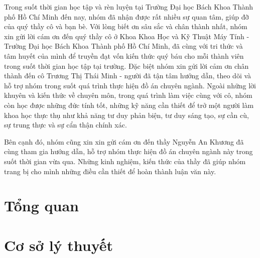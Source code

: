 \documentclass[a4paper, oneside, 12pt]{report}
\theoremstyle{definition}
\begin{document}
	Trong suốt thời gian học tập và rèn luyện tại Trường Đại học Bách Khoa Thành phố Hồ Chí Minh đến nay, nhóm đã nhận được rất nhiều sự quan tâm, giúp đỡ của quý thầy cô và bạn bè. Với lòng biết ơn sâu sắc và chân thành nhất, nhóm xin gửi lời cám ơn đến quý thầy cô ở Khoa Khoa Học và Kỹ Thuật Máy Tính - Trường Đại học Bách Khoa Thành phố Hồ Chí Minh, đã cùng với tri thức và tâm huyết của mình để truyền đạt vốn kiến thức quý báu cho mỗi thành viên trong suốt thời gian học tập tại trường. Đặc biệt nhóm xin gửi lời cảm ơn chân thành đến cô Trương Thị Thái Minh - người đã tận tâm hướng dẫn, theo dõi và hỗ trợ nhóm trong suốt quá trình thực hiện đồ án chuyên ngành. Ngoài những lời khuyên và kiến thức về chuyên môn, trong quá trình làm việc cùng với cô, nhóm còn học được những đức tính tốt, những kỹ năng cần thiết để trở một người làm khoa học thực thụ như khả năng tư duy phản biện, tư duy sáng tạo, sự cần cù, sự trung thực và sự cẩn thận chính xác.
	
	Bên cạnh đó, nhóm cũng xin xin gửi cám ơn đến thầy Nguyễn An Khương đã cùng tham gia hướng dẫn, hỗ trợ nhóm thực hiện đồ án chuyên ngành này trong suốt thời gian vừa qua. Những kinh nghiệm, kiến thức của thầy đã giúp nhóm trang bị cho mình những điều cần thiết để hoàn thành luận văn này. 


\setlength{\parskip}{0mm}

\tableofcontents

\newpage
\listoffigures
\newpage

\listoftables



\chapter{Tổng quan}



\chapter{Cơ sở lý thuyết}

\end{document}
